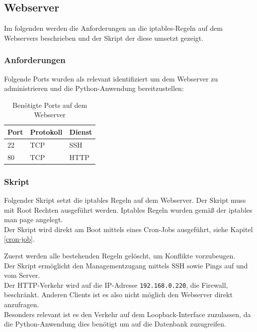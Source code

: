 \documentclass[
    a4paper,
    pagesize,
	pdftex,
    12pt,
]{scrartcl}
\begin{document}
\subsection{Webserver}\label{config-firewall-ws}
Im folgenden werden die Anforderungen an die iptables-Regeln auf dem Webservers beschrieben und der Skript der diese umsetzt gezeigt.

\subsubsection{Anforderungen}
Folgende Ports wurden als relevant identifiziert um dem Webserver zu administrieren und die Python-Anwendung bereitzustellen:
\begin{table}[h!]
	\begin{center}
		\label{tab:table4}
		\begin{tabular}{l|l |l }
			\textbf{Port} & \textbf{Protokoll} & \textbf{Dienst} \\
			\hline
			22 & TCP & SSH \\
			80 & TCP & HTTP \\
		\end{tabular}
		\caption{Benötigte Ports auf dem Webserver}
	\end{center}
\end{table}

\subsubsection{Skript}
Folgender  Skript setzt die iptables Regeln auf dem Webserver. Der  Skript muss mit Root Rechten ausgeführt  werden.
Iptables Regeln wurden gemäß der iptables man page \cite{iptables-manpage} angelegt. \\
Der Skript wird direkt am Boot mittels eines Cron-Jobs ausgeführt, siehe Kapitel \ref{cron-job}.

Zuerst werden  alle bestehenden Regeln gelöscht, um Konflikte vorzubeugen. \\
Der Skript ermöglicht den Managementzugang mittels SSH sowie Pings auf und vom  Server. \\
Der HTTP-Verkehr wird auf die IP-Adresse \lstinline[breaklines]|192.168.0.220|, die Firewall, beschränkt. Anderen Clients ist es also nicht möglich den Webserver direkt anzufragen. \\
Besonders relevant ist es den Verkehr auf dem Loopback-Interface zuzulassen, da die Python-Anwendung dies benötigt um auf die Datenbank zuzugreifen.
\end{document}
